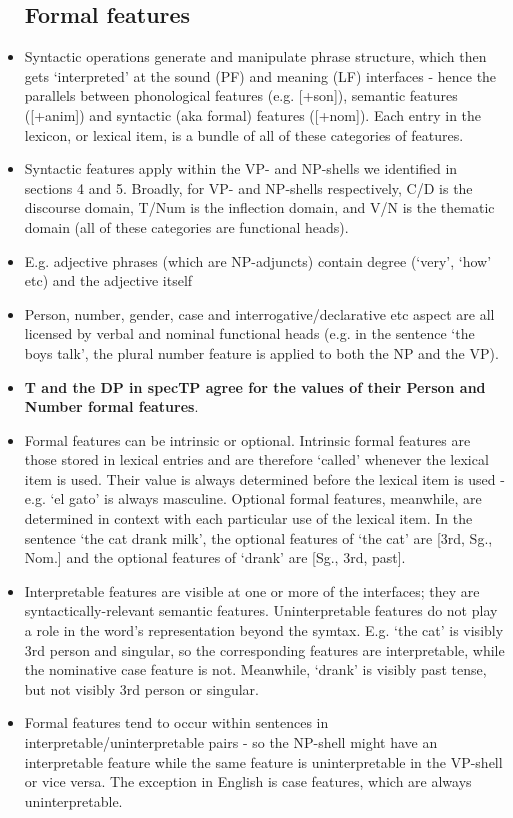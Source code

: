 \documentclass{article}
\begin{document}
\begin{itemize}
    \subsection{Formal features}
    \item Syntactic operations generate and manipulate phrase structure, which then gets `interpreted' at the sound (PF) and meaning (LF) interfaces - hence the parallels between phonological features (e.g. [+son]), semantic features ([+anim]) and syntactic (aka formal) features ([+nom]). Each entry in the lexicon, or lexical item, is a bundle of all of these categories of features.
    \item Syntactic features apply within the VP- and NP-shells we identified in sections 4 and 5. Broadly, for VP- and NP-shells respectively, C/D is the discourse domain, T/Num is the inflection domain, and V/N is the thematic domain (all of these categories are functional heads).
    \item E.g. adjective phrases (which are NP-adjuncts) contain degree (`very', `how' etc) and the adjective itself
    \item Person, number, gender, case and interrogative/declarative etc aspect are all licensed by verbal and nominal functional heads (e.g. in the sentence `the boys talk', the plural number feature is applied to both the NP and the VP).
    \item \textbf{T and the DP in specTP agree for the values of their Person and Number formal features}.
    \item Formal features can be intrinsic or optional. Intrinsic formal features are those stored in lexical entries and are therefore `called' whenever the lexical item is used. Their value is always determined before the lexical item is used - e.g. `el gato' is always masculine. Optional formal features, meanwhile, are determined in context with each particular use of the lexical item. In the sentence `the cat drank milk', the optional features of `the cat' are [3rd, Sg., Nom.] and the optional features of `drank' are [Sg., 3rd, past].
    \item Interpretable features are visible at one or more of the interfaces; they are syntactically-relevant semantic features. Uninterpretable features do not play a role in the word's representation beyond the symtax. E.g. `the cat' is visibly 3rd person and singular, so the corresponding features are interpretable, while the nominative case feature is not. Meanwhile, `drank' is visibly past tense, but not visibly 3rd person or singular. 
    \item Formal features tend to occur within sentences in interpretable/uninterpretable pairs - so the NP-shell might have an interpretable feature while the same feature is uninterpretable in the VP-shell or vice versa. The exception in English is case features, which are always uninterpretable.

\end{itemize}
\end{document}
